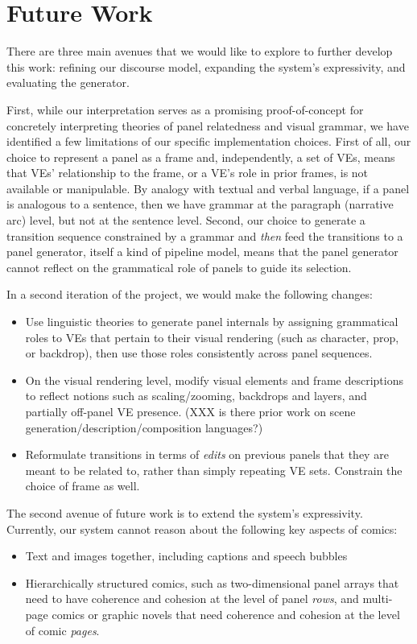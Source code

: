 \section{Future Work}

There are three main avenues that we would like to explore to further develop
this work: refining our discourse model, expanding the system's
expressivity, and evaluating the generator.

First, while our interpretation serves as a promising proof-of-concept for
concretely interpreting theories of panel relatedness and visual grammar,
we have identified a few limitations of our specific implementation
choices.  First of all, our choice to represent a panel as a frame and,
independently, a set of VEs, means that VEs' relationship to the frame, or
a VE's role in prior frames, is not available or manipulable.  By analogy
with textual and verbal language, if a panel is analogous to a sentence,
then we have grammar at the paragraph (narrative arc) level, but not at
the sentence level.  Second, our choice to generate a transition sequence
constrained by a grammar and {\em then} feed the transitions to a panel
generator, itself a kind of pipeline model, means that the panel generator
cannot reflect on the grammatical role of panels to guide its selection.

In a second iteration of the project, we would make the following changes:
\begin{itemize}
\item Use linguistic theories to generate panel internals by assigning
grammatical roles to VEs that pertain to their visual rendering (such as
character, prop, or backdrop), then use those roles consistently across
panel sequences.
\item On the visual rendering level, modify visual elements and frame
descriptions to reflect notions such as scaling/zooming, backdrops and
layers, and partially off-panel VE presence. (XXX is there prior work on scene
generation/description/composition languages?)
\item Reformulate transitions in terms of {\em edits} on previous panels
that they are meant to be related to, rather than simply repeating VE sets.
Constrain the choice of frame as well.
\end{itemize}

The second avenue of future work is to extend the system's expressivity.
Currently, our system cannot reason about the following key aspects of
comics:
\begin{itemize}
\item Text and images together, including captions and speech bubbles
\item Hierarchically structured comics, such as two-dimensional panel
arrays that need to have coherence and cohesion at the level of panel {\em
rows}, and multi-page comics or graphic novels that need coherence and
cohesion at the level of comic {\em pages}.
\end{itemize}

